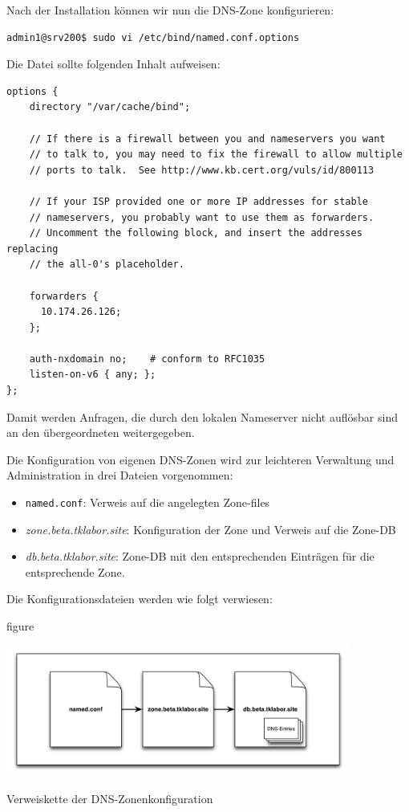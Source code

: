 Nach der Installation können wir nun die DNS-Zone konfigurieren:
\begin{lstlisting}
admin1@srv200$ sudo vi /etc/bind/named.conf.options
\end{lstlisting}
Die Datei sollte folgenden Inhalt aufweisen:
\begin{scriptsize}
\begin{lstlisting}
options {
    directory "/var/cache/bind";

    // If there is a firewall between you and nameservers you want
    // to talk to, you may need to fix the firewall to allow multiple
    // ports to talk.  See http://www.kb.cert.org/vuls/id/800113
  
    // If your ISP provided one or more IP addresses for stable 
    // nameservers, you probably want to use them as forwarders.  
    // Uncomment the following block, and insert the addresses replacing
    // the all-0's placeholder.

    forwarders {
      10.174.26.126;
    };

    auth-nxdomain no;    # conform to RFC1035
    listen-on-v6 { any; };
};
\end{lstlisting}
\end{scriptsize}

Damit werden Anfragen, die durch den lokalen Nameserver nicht auflösbar sind an den übergeordneten weitergegeben.

Die Konfiguration von eigenen DNS-Zonen wird zur leichteren Verwaltung und
Administration in drei Dateien vorgenommen:
\begin{itemize}
  \item \texttt{named.conf}: Verweis auf die angelegten Zone-files
  \item \textit{zone.beta.tklabor.site}: Konfiguration der Zone und Verweis auf
  die Zone-DB
  \item \textit{db.beta.tklabor.site}: Zone-DB mit den entsprechenden Einträgen
  für die entsprechende Zone.
\end{itemize}

Die Konfigurationsdateien werden wie folgt verwiesen:

\begin{nofloat}{figure}
	\begin{center}
		\includegraphics[width=0.85\textwidth]{images/dns-files.png}
	\end{center}
	\caption{Verweiskette der DNS-Zonenkonfiguration}
	\label{fig:bind-config-chain}
\end{nofloat}

